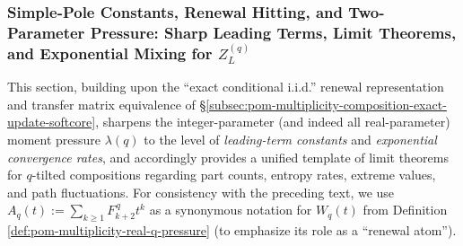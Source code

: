 %
%

\subsubsection{Simple-Pole Constants, Renewal Hitting, and Two-Parameter Pressure: Sharp Leading Terms, Limit Theorems, and Exponential Mixing for \texorpdfstring{$Z_L^{(q)}$}{ZLq}}\label{subsec:pom-multiplicity-composition-sharp-asymptotics-renewal}
This section, building upon the ``exact conditional i.i.d.'' renewal representation and transfer matrix equivalence of \S\ref{subsec:pom-multiplicity-composition-exact-update-softcore},
sharpens the integer-parameter (and indeed all real-parameter) moment pressure \(\lambda(q)\) to the level of \emph{leading-term constants} and \emph{exponential convergence rates},
and accordingly provides a unified template of limit theorems for \(q\)-tilted compositions regarding part counts, entropy rates, extreme values, and path fluctuations.
For consistency with the preceding text, we use
\(
A_q(t):=\sum_{k\ge 1}F_{k+2}^{\,q}t^k
\)
as a synonymous notation for \(W_q(t)\) from Definition \ref{def:pom-multiplicity-real-q-pressure} (to emphasize its role as a ``renewal atom'').

